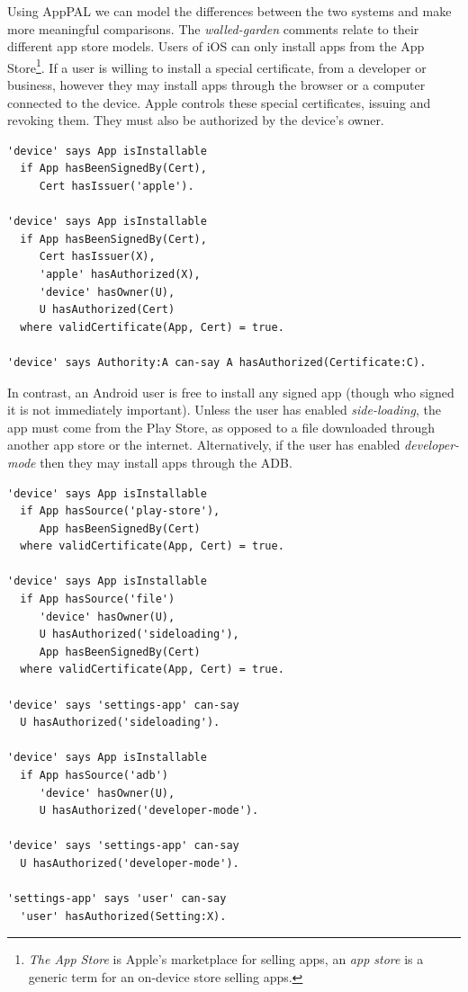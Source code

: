 \documentclass[thesis.tex]{subfiles}
\begin{document}
Using AppPAL we can model the differences between the two systems and make more
meaningful comparisons. The \emph{walled-garden} comments relate to their
different app store models. Users of iOS can only install apps from the App
Store\footnote{\emph{The App Store} is Apple's marketplace for selling apps, an
\emph{app store} is a generic term for an on-device store selling apps.}. If a
user is willing to install a special certificate, from a developer or business,
however they may install apps through the browser or a computer connected to the
device. Apple controls these special certificates, issuing and revoking them.
They must also be authorized by the device's owner.
\begin{lstlisting}
'device' says App isInstallable
  if App hasBeenSignedBy(Cert),
     Cert hasIssuer('apple').

'device' says App isInstallable
  if App hasBeenSignedBy(Cert),
     Cert hasIssuer(X),
     'apple' hasAuthorized(X),
     'device' hasOwner(U),
     U hasAuthorized(Cert)
  where validCertificate(App, Cert) = true.

'device' says Authority:A can-say A hasAuthorized(Certificate:C).
\end{lstlisting}
In contrast, an Android user is free to install any signed app (though
who signed it is not immediately important).  Unless the user has
enabled \emph{side-loading}, the app must come from the Play Store, as
opposed to a file downloaded through another app store or the
internet.  Alternatively, if the user has enabled
\emph{developer-mode} then they may install apps through the \ac{ADB}.
\begin{lstlisting}
'device' says App isInstallable
  if App hasSource('play-store'),
     App hasBeenSignedBy(Cert)
  where validCertificate(App, Cert) = true.

'device' says App isInstallable
  if App hasSource('file')
     'device' hasOwner(U),
     U hasAuthorized('sideloading'),
     App hasBeenSignedBy(Cert)
  where validCertificate(App, Cert) = true.

'device' says 'settings-app' can-say
  U hasAuthorized('sideloading').

'device' says App isInstallable
  if App hasSource('adb')
     'device' hasOwner(U),
     U hasAuthorized('developer-mode').

'device' says 'settings-app' can-say
  U hasAuthorized('developer-mode').

'settings-app' says 'user' can-say
  'user' hasAuthorized(Setting:X).
\end{lstlisting}
\end{document}
